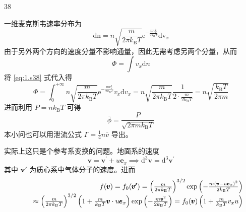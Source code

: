 \begin{solution}{38}
    \begin{subsolution}
        一维麦克斯韦速率分布为
        \begin{equation}
            \mathrm{dn} = n \sqrt {\frac {m}{2 \pi k _ {\mathrm{B}} T}} \mathrm{e} ^ {- \frac {m v _ {x} ^ {2}}{2 k _ {\mathrm{B}} T}} \mathrm{dv} _ {x}
            \label{eq:1.s38}
        \end{equation}
        由于另外两个方向的速度分量不影响通量，因此无需考虑另两个分量，从而
        \begin{equation}
            \varPhi = \int v _ {x} \mathrm{d} n
            \label{eq:2.s38}
        \end{equation}
        将 \eqref{eq:1.s38} 式代入得
        \begin{equation}
            \varPhi = \int_ {0} ^ {+ \infty} n \sqrt {\frac {m}{2 \pi k _ {\mathrm{B}} T}} \mathrm{e} ^ {- \frac {m v _ {x} ^ {2}}{2 k _ {\mathrm{B}} T}} v _ {x} \mathrm{d} v _ {x} = n \sqrt {\frac {m}{2 \pi k _ {\mathrm{B}} T}} \frac {1}{2 \cdot \frac {m}{2 k _ {\mathrm{B}} T}} = n \sqrt {\frac {k _ {\mathrm{B}} T}{2 \pi m}}
            \label{eq:3.s38}
        \end{equation}
        进而利用 $P = nk_{\mathrm{B}}T$ 可得
        \begin{equation}
            \bar {\phi} = \frac {P}{\sqrt {2 \pi m k _ {\mathrm{B}} T}}
            \label{eq:4.s38}
        \end{equation}
        本小问也可以用泄流公式 $\Gamma = \frac{1}{4} n\overline{v}$ 导出。
    \end{subsolution}
    \begin{subsolution}
        \begin{subsubsolution}
            实际上这只是个参考系变换的问题。地面系的速度
            \begin{equation}
                \boldsymbol {v} = \boldsymbol {v} ^ {\prime} + u \boldsymbol {e} _ {x} \implies \mathrm{d} ^ {3} \boldsymbol {v} = \mathrm{d} ^ {3} \boldsymbol {v} ^ {\prime}
                \label{eq:5.s38}
            \end{equation}
            其中 $\boldsymbol{v}'$ 为质心系中气体分子的速度。进而
            \begin{equation}
                \begin{array}{r l r} & & {f (\pmb {v}) = f _ {0} (\pmb {v ^ {\prime}}) = \left(\frac {m}{2 \pi k _ {\mathrm{B}} T}\right) ^ {3 / 2} \exp \left(- \frac {m (\pmb {v} - u \pmb {e} _ {x}) ^ {2}}{2 k _ {\mathrm{B}} T}\right)} \\ & & {\approx \left(\frac {m}{2 \pi k _ {\mathrm{B}} T}\right) ^ {3 / 2} \left(1 + \frac {m}{k _ {\mathrm{B}} T} \pmb {v} \cdot u \pmb {e} _ {x}\right) \exp \left(- \frac {m \pmb {v} ^ {2}}{2 k _ {\mathrm{B}} T}\right) = f _ {0} (\pmb {v}) \left(1 + \frac {m}{k _ {\mathrm{B}} T} v _ {x} u\right)} \end{array}

\end{equation}
\end{subsubsolution}
\end{subsolution}
\end{solution}
